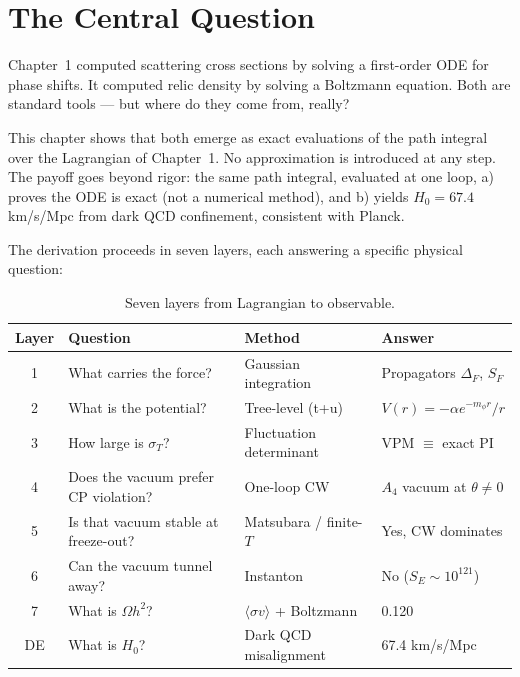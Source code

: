 
\section{The Central Question}
\label{ch2:question}

Chapter~1 computed scattering cross sections by solving a first-order ODE for
phase shifts. It computed relic density by solving a Boltzmann equation.
Both are standard tools — but where do they come from, really?

This chapter shows that both emerge as exact evaluations of the path integral
over the Lagrangian of Chapter~1. No approximation is introduced at any step.
The payoff goes beyond rigor: the same path integral, evaluated at one loop,
a) proves the ODE is exact (not a numerical method), and b) yields $H_0 = 67.4$
km/s/Mpc from dark QCD confinement, consistent with Planck.

The derivation proceeds in seven layers, each answering a specific physical question:

\begin{table}[h!]
\centering
\caption{Seven layers from Lagrangian to observable.}
\begin{tabular}{clll}
\toprule
Layer & Question & Method & Answer \\
\midrule
1 & What carries the force? & Gaussian integration & Propagators $\Delta_F$, $S_F$ \\
2 & What is the potential? & Tree-level (t+u) & $V(r) = -\alpha e^{-m_\phi r}/r$ \\
3 & How large is $\sigma_T$? & Fluctuation determinant & VPM $\equiv$ exact PI \\
4 & Does the vacuum prefer CP violation? & One-loop CW & $A_4$ vacuum at $\theta \neq 0$ \\
5 & Is that vacuum stable at freeze-out? & Matsubara / finite-$T$ & Yes, CW dominates \\
6 & Can the vacuum tunnel away? & Instanton & No ($S_E \sim 10^{121}$) \\
7 & What is $\Omega h^2$? & $\langle\sigma v\rangle$ + Boltzmann & 0.120 \\
DE & What is $H_0$? & Dark QCD misalignment & 67.4 km/s/Mpc \\
\bottomrule
\end{tabular}
\end{table}

